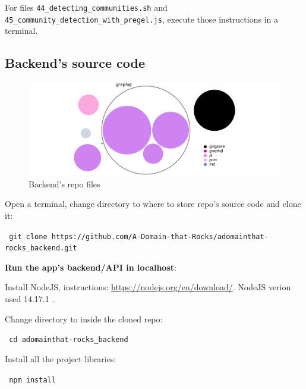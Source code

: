 \noindent For files \texttt{44\_de\-tec\-ting\_com\-mu\-ni\-ties.sh} and \texttt{45\_com\-mu\-ni\-ty\_de\-tec\-tion\_with\_pre\-gel.js}, execute those instructions in a terminal.

\subsection{Backend's source code} \label{subsection:SourceCode/Instructionshowtorunbuildanddeploy/Backendssourcecode}
\begin{figure}[H]%
	\centering%
	\includegraphics[width=1\textwidth]{images/appendixA/sourcecodebackendnew.pdf}%
	\caption[Backend's repo files]{Backend's repo files}%
	\label{fig:sourcecodebackendnew}%
\end{figure}%

\noindent Open a terminal, change directory to where to store repo's source code and clone it:

\noindent\colorbox{lightestgray}{
	\parbox{1\linewidth-9pt}{%
		\texttt{\tiny\faDollarSign\large\ git clone https://github.com/A-Domain-that-Rocks/adomainthat-rocks\_backend.git}
	}%
}%

\bigskip

\noindent \textbf{Run the app's backend/\acrshort{API} in localhost}:

\noindent Install NodeJS, instructions: \url{https://nodejs.org/en/download/}. NodeJS verion used 14.17.1 .

\noindent Change directory to inside the cloned repo:

\noindent\colorbox{lightestgray}{
	\parbox{1\linewidth-9pt}{%
		\texttt{\tiny\faDollarSign\large\ cd adomainthat-rocks\_backend}
	}%
}%

\medskip

\noindent Install all the project libraries:

\noindent\colorbox{lightestgray}{
	\parbox{1\linewidth-9pt}{%
		\texttt{\tiny\faDollarSign\large\ npm install}
	}%
}%

\medskip


